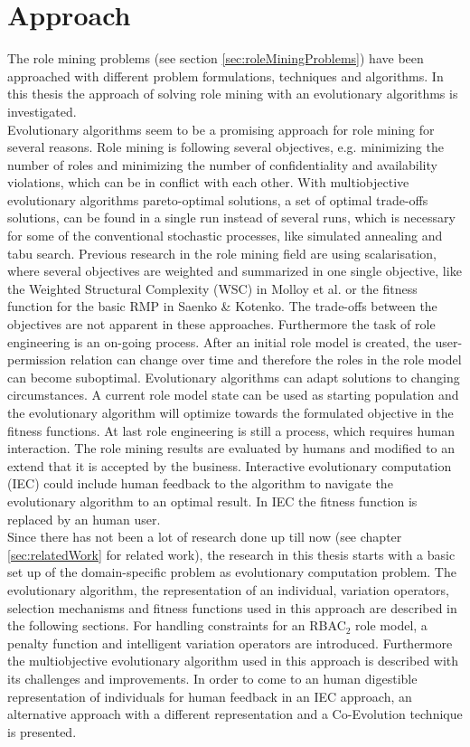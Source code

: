 \newpage
\section{Approach}
The role mining problems (see section \ref{sec:roleMiningProblems}) have been approached with different problem formulations, techniques and algorithms. In this thesis the approach of solving role mining with an evolutionary algorithms is investigated.\\
Evolutionary algorithms seem to be a promising approach for role mining for several reasons. Role mining is following several objectives, e.g. minimizing the number of roles and minimizing the number of confidentiality and availability violations, which can be in conflict with each other. With multiobjective evolutionary algorithms pareto-optimal solutions, a set of optimal trade-offs solutions, can be found in a single run instead of several runs, which is necessary for some of the conventional stochastic processes, like simulated annealing and tabu search\cite{abraham2005evolutionary}. Previous research in the role mining field are using scalarisation, where several objectives are weighted and summarized in one single objective, like the Weighted Structural Complexity (WSC) in Molloy et al.\cite{Molloy} or the fitness function for the basic RMP in Saenko \& Kotenko\cite{saenko2012design}. The trade-offs between the objectives are not apparent in these approaches. Furthermore the task of role engineering is an on-going process. After an initial role model is created, the user-permission relation can change over time and therefore the roles in the role model can become suboptimal. Evolutionary algorithms can adapt solutions to changing circumstances\cite{Fogel:1997}. A current role model state can be used as starting population and the evolutionary algorithm will optimize towards the formulated objective in the fitness functions. At last role engineering is still a process, which requires human interaction. The role mining results are evaluated by humans and modified to an extend that it is accepted by the business. Interactive evolutionary computation (IEC)\cite{949485} could include human feedback to the algorithm to navigate the evolutionary algorithm to an optimal result. In IEC the fitness function is replaced by an human user.\\
Since there has not been a lot of research done up till now (see chapter \ref{sec:relatedWork} for related work), the research in this thesis starts with a basic set up of the domain-specific problem as evolutionary computation problem. The evolutionary algorithm, the representation of an individual, variation operators, selection mechanisms and fitness functions used in this approach are described in the following sections. For handling constraints for an RBAC$_2$ role model, a penalty function and intelligent variation operators are introduced. Furthermore the multiobjective evolutionary algorithm used in this approach is described with its challenges and improvements. In order to come to an human digestible representation of individuals for human feedback in an IEC approach, an alternative approach with a different representation and a Co-Evolution technique is presented.\\

